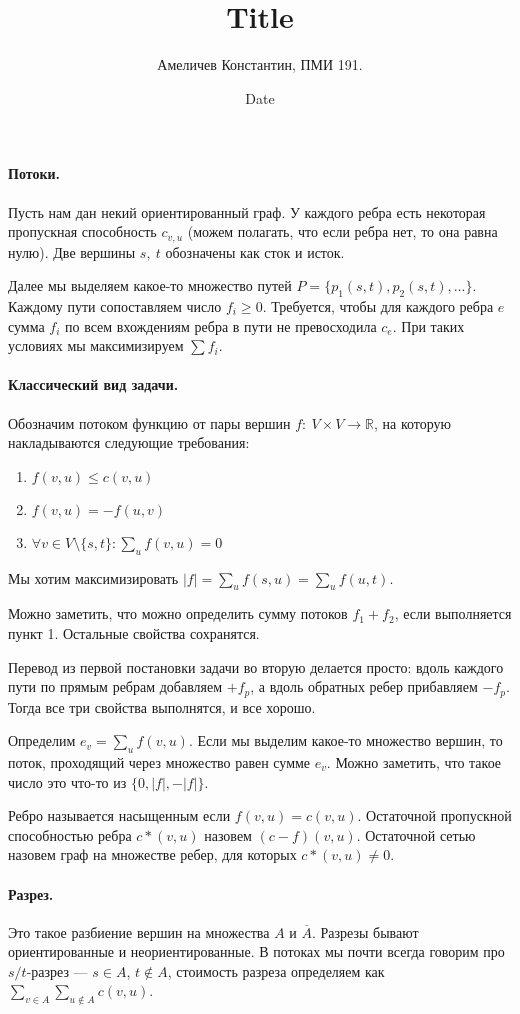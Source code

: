 \documentclass[12pt]{article}
\title{Title}
\author{Амеличев Константин, ПМИ 191.}
\date{Date}
\begin{document}
\paragraph{Потоки.} Пусть нам дан некий ориентированный граф. У каждого ребра есть некоторая пропускная способность $c_{v, u}$ (можем полагать, что если ребра нет, то она равна нулю). Две вершины $s,\ t$ обозначены как сток и исток.

Далее мы выделяем какое-то множество путей $P = \{p_1(s, t), p_2(s, t), \ldots\}$. Каждому пути сопоставляем число $f_i \ge 0$. Требуется, чтобы для каждого ребра $e$ сумма $f_i$ по всем вхождениям ребра в пути не превосходила $c_e$. При таких условиях мы максимизируем $\sum f_i$.
\paragraph{Классический вид задачи.} Обозначим потоком функцию от пары вершин $f:\ V \times V \rightarrow \mathbb{R}$, на которую накладываются следующие требования:

\begin{enumerate}
    \item $f(v, u) \le c(v, u)$
    \item $f(v, u) = -f(u, v)$
    \item $\forall v \in V \setminus \{s, t\}: \displaystyle \sum_{u} f(v, u) = 0$
\end{enumerate}

Мы хотим максимизировать $|f| = \sum_{u} f(s, u) = \sum_{u} f(u, t)$.

Можно заметить, что можно определить сумму потоков $f_1 + f_2$, если выполняется пункт 1. Остальные свойства сохранятся.

Перевод из первой постановки задачи во вторую делается просто: вдоль каждого пути по прямым ребрам добавляем $+f_p$, а вдоль обратных ребер прибавляем $-f_p$. Тогда все три свойства выполнятся, и все хорошо. 

Определим $e_v = \displaystyle \sum_{u} f(v, u)$. Если мы выделим какое-то множество вершин, то поток, проходящий через множество равен сумме $e_v$. Можно заметить, что такое число это что-то из $\{0, |f|, -|f|\}$.

Ребро называется насыщенным если $f(v, u) = c(v, u)$. Остаточной пропускной способностью ребра $c*(v, u)$ назовем $(c - f)(v, u)$. Остаточной сетью назовем граф на множестве ребер, для которых $c*(v, u) \neq 0$.
\paragraph{Разрез.} Это такое разбиение вершин на множества $A$ и $\overline A$. Разрезы бывают ориентированные и неориентированные. В потоках мы почти всегда говорим про $s/t$-разрез --- $s \in A$, $t \notin A$, стоимость разреза определяем как $\displaystyle \sum_{v \in A} \sum_{u \notin A} c(v, u)$.
\end{document}
